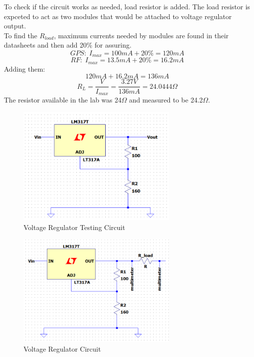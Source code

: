 To check if the circuit works as needed, load resistor is added. The load resistor is expceted to act as two modules that would 
be attached to voltage regulator output. \\
To find the $R_{load}$, maximum currents needed by modules are found in their datasheets and then add 20\% for assuring.\\
\[GPS:\; I_{max} = 100mA + 20\% = 120mA \]
\[RF:\; I_{max} = 13.5mA + 20\% = 16.2mA \]
Adding them:
\[120mA+16.2mA = 136mA\]
\[R_{L}=\frac{V}{I_{max}}=\frac{3.27V}{136mA} = 24.0444 \Omega\]
The resistor available in the lab was 24$\Omega$ and measured to be 24.2$\Omega$.\\
\begin{figure}[H]
    \centering
    \includegraphics[width=0.7\textwidth]{voltagereg_circuit.png}
    \caption{Voltage Regulator Testing Circuit}
    \label{Figure: Voltage Regulator Testing Circuit}
\end{figure}
\begin{figure}[H]
    \centering
    \includegraphics[width=0.7\textwidth]{testin_voltagereg_circuit.png}
    \caption{Voltage Regulator Circuit}
    \label{Figure: Voltage Regulator Circuit}
\end{figure}
